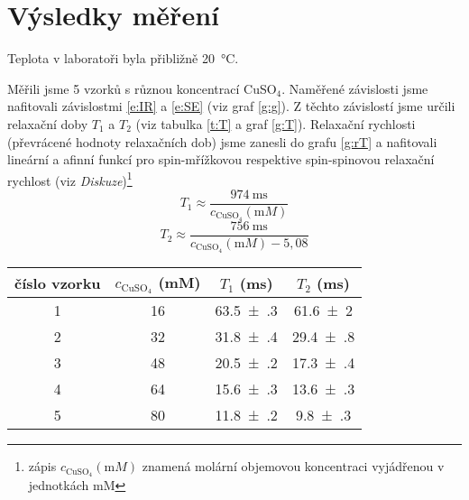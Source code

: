 \section*{Výsledky měření}
Teplota v laboratoři byla přibližně \SI{20}{\degreeCelsius}.

Měřili jsme 5 vzorků s různou koncentrací CuSO$_4$.
Naměřené závislosti jsme nafitovali závislostmi \eqref{e:IR} a \eqref{e:SE} (viz graf \ref{g:g}). 
Z těchto závislostí jsme určili relaxační doby $T_1$ a $T_2$ (viz tabulka \ref{t:T} a graf \ref{g:T}).
Relaxační rychlosti (převrácené hodnoty relaxačních dob) jsme zanesli do grafu \ref{g:rT} a nafitovali lineární a afinní funkcí pro spin-mřížkovou respektive spin-spinovou relaxační rychlost (viz \emph{Diskuze})\footnote{zápis $c_{\text{CuSO}_4}(\si{\milli M})$ znamená molární objemovou koncentraci vyjádřenou v jednotkách \si{\milli M} }
\begin{equation*}
T_1 \approx \frac{\SI{974}{\milli\second}}{c_{\text{CuSO}_4}(\si{\milli M})}
\end{equation*}
\begin{equation*}
T_2 \approx \frac{\SI{756}{\milli\second}}{c_{\text{CuSO}_4}(\si{\milli M})  - 5,08}
\end{equation*}


\begin{graph}[htbp] 
\centering

\caption{Závislost amplitudy signálu na odstupu pulzů $t_w$ (osa $x$ (\si{\ms})).}
\label{g:g}
\end{graph}

\begin{tabulka}[htbp]
\centering
\begin{tabular}{c|ccc}
číslo vzorku & $c_{\text{CuSO}_4}$ (\si{\milli M}) & $T_1$ (\si{\ms}) & $T_2$ (\si{\ms}) \\
\hline
1 & 16 & \num{63.5(3)} & \num{61.6(20)} \\
2 & 32 & \num{31.8(4)} & \num{29.4(8)} \\
3 & 48 & \num{20.5(2)} & \num{17.3(4)} \\
4 & 64 & \num{15.6(3)} & \num{13.6(3)} \\
5 & 80 & \num{11.8(2)} & \num{9.8(3)} \\
\end{tabular}
\caption{Relaxační doby signálu NMR $^1$H v roztocích s proměnnou koncentrací CuSO$_4$}
\label{t:T}
\end{tabulka}

\begin{graph}[htbp] 
\centering

\caption{Převrácené relaxační doby signálu NMR $^1$H v roztocích s proměnnou koncentrací CuSO$_4$}
\label{g:rT}
\end{graph}

\begin{graph}[htb] 
\centering

\caption{Relaxační doby signálu NMR $^1$H v roztocích s proměnnou koncentrací CuSO$_4$}
\label{g:T}
\end{graph}


